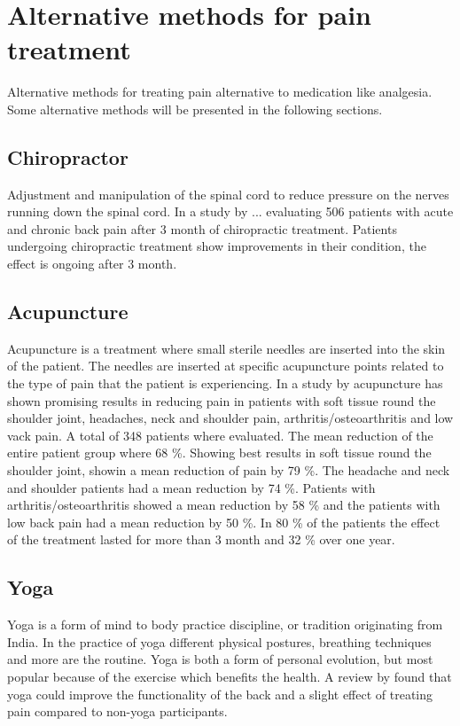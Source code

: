 \section{Alternative methods for pain treatment}
Alternative methods for treating pain alternative to medication like analgesia. Some alternative methods will be presented in the following sections. 

\subsection{Chiropractor}
Adjustment and manipulation of the spinal cord to reduce pressure on the nerves running down the spinal cord.
In a study by ... evaluating 506 patients with acute and chronic back pain after 3 month of chiropractic treatment.
Patients undergoing chiropractic treatment show improvements in their condition, the effect is ongoing after 3 month.  
\subsection{Acupuncture}
Acupuncture is a treatment where small sterile needles are inserted into the skin of the patient. The needles are inserted at specific acupuncture points related to the type of pain that the patient is experiencing. 
In a study by \cite{Junnilla1983} acupuncture has shown promising results in reducing pain in patients with soft tissue round the shoulder joint, headaches, neck and shoulder pain, arthritis/osteoarthritis and low vack pain. A total of 348 patients where evaluated. The mean reduction of the entire patient group where 68 \%. Showing best results in soft tissue round the shoulder joint, showin a mean reduction of pain by 79 \%. The headache and neck and shoulder patients had a mean reduction by 74 \%. Patients with  arthritis/osteoarthritis showed a mean reduction by 58 \% and the patients with low back pain had a mean reduction by 50 \%. In 80 \% of the patients the effect of the treatment lasted for more than 3 month and 32 \% over one year. \cite{Junnilla1983}

\subsection{Yoga}
Yoga is a form of mind to body practice discipline, or tradition originating from India. In the practice of yoga different physical postures, breathing techniques and more are the routine. 
Yoga is both a form of personal evolution, but most popular because of the exercise which benefits the health.
A review by \cite{...} found that yoga could improve the functionality of the back and a slight effect of treating pain compared to non-yoga participants. 

